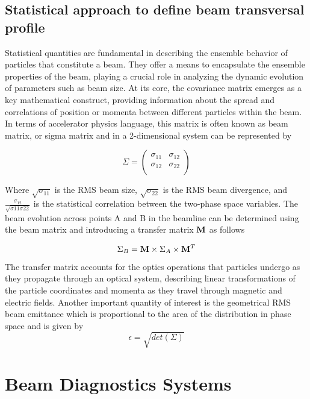 \documentclass{article}
\begin{document}
\subsection{Statistical approach to define beam transversal profile}
Statistical quantities are fundamental in describing the ensemble behavior of particles that constitute a beam.  They offer a means to encapsulate the ensemble properties of the beam, playing a crucial role in analyzing the dynamic evolution of parameters such as beam size. At its core, the covariance matrix emerges as a key mathematical construct, providing information about the spread and correlations of position or momenta between different particles within the beam. In terms of accelerator physics language, this matrix is often known as beam matrix, or sigma matrix and in a 2-dimensional system can be represented by 

\begin{equation} 
\Sigma = \begin{pmatrix}
\sigma_{11}  & \sigma_{12} \\
\sigma_{12}  & \sigma_{22} \\
\end{pmatrix}
\end{equation}

Where $\sqrt{\sigma_{11}}$ is the RMS beam size, $\sqrt{\sigma_{22}}$ is the RMS beam divergence, and $\frac{\sigma_{12}}{\sqrt{\sigma{11} \sigma{22}}}$ is the statistical correlation between the two-phase space variables. The beam evolution across points A and B in the beamline can be determined using the beam matrix and introducing a transfer matrix $\bold{M}$ as follows 

\begin{equation} 
\Sigma_{B} = \bold{M} \times \Sigma_{A} \times   \bold{M}^{T}
\end{equation}
 The transfer matrix accounts for the optics operations that particles undergo as they propagate through an optical system, describing linear transformations of the particle coordinates and momenta as they travel through magnetic and electric fields. Another important quantity of interest is the geometrical RMS beam emittance which is proportional to the area of the distribution in phase space and is given by 
\begin{equation} 
\epsilon = \sqrt{det (\Sigma)}
\end{equation}

\section{Beam Diagnostics Systems}
\end{document}
